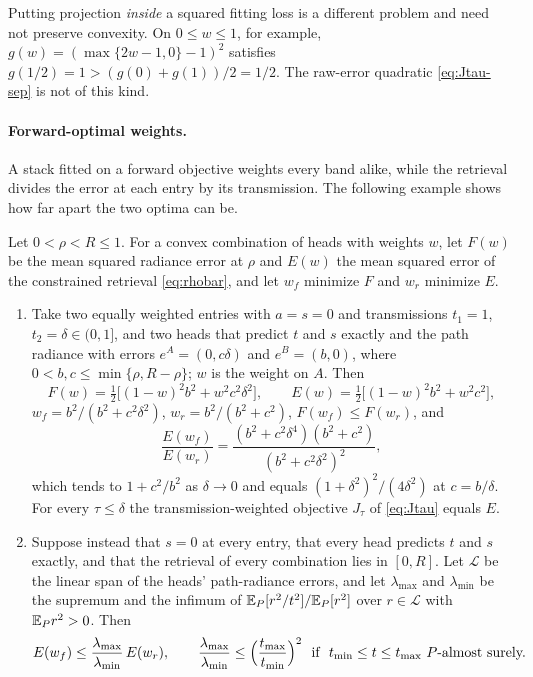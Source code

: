 Putting projection \emph{inside} a squared fitting loss is a different problem and need
not preserve convexity. On $0\le w\le1$, for example,
$g(w)=(\max\{2w-1,0\}-1)^2$ satisfies
$g(1/2)=1>(g(0)+g(1))/2=1/2$. The raw-error quadratic \eqref{eq:Jtau-sep} is not of
this kind.

\paragraph{Forward-optimal weights.}
A stack fitted on a forward objective weights every band alike, while the retrieval divides the
error at each entry by its transmission. The following example shows how far apart the two
optima can be.

\begin{proposition}\label{prop:stackweights}
Let $0<\rho<R\le1$. For a convex combination of heads with weights $w$, let $F(w)$ be the mean
squared radiance error at $\rho$ and $E(w)$ the mean squared error of the constrained retrieval
\eqref{eq:rhobar}, and let $w_f$ minimize $F$ and $w_r$ minimize $E$.
\begin{enumerate}
\item Take two equally weighted entries with $a=s=0$ and transmissions $t_1=1$,
$t_2=\delta\in(0,1]$, and two heads that predict $t$ and $s$ exactly and the path radiance with
errors $e^A=(0,c\delta)$ and $e^B=(b,0)$, where $0<b,c\le\min\{\rho,R-\rho\}$; $w$ is the weight on
$A$. Then
\[
F(w)=\tfrac12\bigl[(1-w)^2b^2+w^2c^2\delta^2\bigr],\qquad
E(w)=\tfrac12\bigl[(1-w)^2b^2+w^2c^2\bigr],
\]
$w_f=b^2/(b^2+c^2\delta^2)$, $w_r=b^2/(b^2+c^2)$, $F(w_f)\le F(w_r)$, and
\[
\frac{E(w_f)}{E(w_r)}=\frac{(b^2+c^2\delta^4)(b^2+c^2)}{(b^2+c^2\delta^2)^2},
\]
which tends to $1+c^2/b^2$ as $\delta\to0$ and equals $(1+\delta^2)^2/(4\delta^2)$ at
$c=b/\delta$. For every $\tau\le\delta$ the transmission-weighted objective $J_\tau$ of
\eqref{eq:Jtau} equals $E$.
\item Suppose instead that $s=0$ at every entry, that every head predicts $t$ and $s$ exactly,
and that the retrieval of every combination lies in $[0,R]$. Let $\mathcal L$ be the linear span of
the heads' path-radiance errors, and let $\lambda_{\max}$ and $\lambda_{\min}$ be the supremum and the
infimum of $\mathbb{E}_P[r^2/t^2]/\mathbb{E}_P[r^2]$ over $r\in\mathcal L$ with $\mathbb{E}_Pr^2>0$. Then
\[
E(w_f)\le\frac{\lambda_{\max}}{\lambda_{\min}}\,E(w_r),\qquad
\frac{\lambda_{\max}}{\lambda_{\min}}\le\Bigl(\frac{t_{\max}}{t_{\min}}\Bigr)^2
\ \text{ if }\ t_{\min}\le t\le t_{\max}\ P\text{-almost surely.}
\]
\end{enumerate}
\end{proposition}

